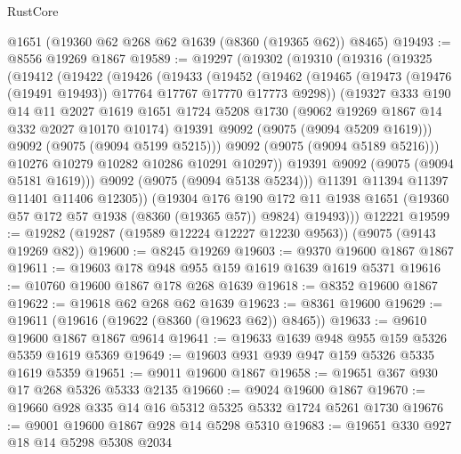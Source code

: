 \begin{lexlean}{RustCore}
\begin{coremodule}
    @1651
    (@19360 @62 @268 @62 @1639 (@8360 (@19365 @62)) @8465)
@19493 := @8556 @19269 @1867
@19589 := @19297
    (@19302
      (@19310
        (@19316
          (@19325
            (@19412
              (@19422
                (@19426
                  (@19433
                    (@19452
                      (@19462
                        (@19465 (@19473 (@19476 (@19491 @19493)) @17764 @17767 @17770 @17773 @9298))
                        (@19327
                          @333
                          @190
                          @14
                          @11
                          @2027
                          @1619
                          @1651
                          @1724
                          @5208
                          @1730
                          (@9062 @19269 @1867 @14 @332 @2027 @10170 @10174)
                          @19391
                          @9092
                          (@9075 (@9094 @5209 @1619)))
                        @9092
                        (@9075 (@9094 @5199 @5215)))
                      @9092
                      (@9075 (@9094 @5189 @5216)))
                    @10276
                    @10279
                    @10282
                    @10286
                    @10291
                    @10297))
                @19391
                @9092
                (@9075 (@9094 @5181 @1619)))
              @9092
              (@9075 (@9094 @5138 @5234)))
            @11391
            @11394
            @11397
            @11401
            @11406
            @12305))
        (@19304
          @176
          @190
          @172
          @11
          @1938
          @1651
          (@19360 @57 @172 @57 @1938 (@8360 (@19365 @57)) @9824)
          @19493)))
    @12221
@19599 := @19282 (@19287 (@19589 @12224 @12227 @12230 @9563)) (@9075 (@9143 @19269 @82))
@19600 := @8245 @19269
@19603 := @9370 @19600 @1867 @1867
@19611 := @19603 @178 @948 @955 @159 @1619 @1639 @1619 @5371
@19616 := @10760 @19600 @1867 @178 @268 @1639
@19618 := @8352 @19600 @1867
@19622 := @19618 @62 @268 @62 @1639
@19623 := @8361 @19600
@19629 := @19611 (@19616 (@19622 (@8360 (@19623 @62)) @8465))
@19633 := @9610 @19600 @1867 @1867 @9614
@19641 := @19633 @1639 @948 @955 @159 @5326 @5359 @1619 @5369
@19649 := @19603 @931 @939 @947 @159 @5326 @5335 @1619 @5359
@19651 := @9011 @19600 @1867
@19658 := @19651 @367 @930 @17 @268 @5326 @5333 @2135
@19660 := @9024 @19600 @1867
@19670 := @19660 @928 @335 @14 @16 @5312 @5325 @5332 @1724 @5261 @1730
@19676 := @9001 @19600 @1867 @928 @14 @5298 @5310
@19683 := @19651 @330 @927 @18 @14 @5298 @5308 @2034

\end{coremodule}
\end{lexlean}
